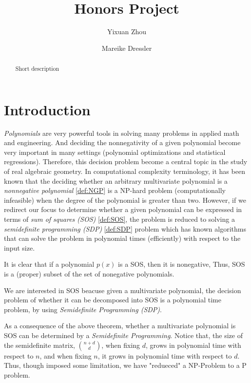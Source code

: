 \documentclass[12pt]{amsart}
\title{Honors Project}
\author{Yixuan Zhou} \author{Mareike Dressler} %
\numberwithin{equation}{section}
\theoremstyle{definition}
\numberwithin{thm}{section}
\begin{document}
 

\begin{abstract}
Short description
\end{abstract}

\maketitle


\section{Introduction} 

\emph{Polynomials} are very powerful tools in solving many problems in applied math and engineering. 
And deciding the nonnegativity of a given polynomial become very important in many settings (polynomial optimizations and statistical regressions). 
Therefore, this decision problem become a central topic in the study of real algebraic geometry. 
In computational complexity terminology, it has been known that the deciding whether an arbitrary multivariate polynomial is a \emph{nonnegative polynomial} \ref{def:NGP} is a NP-hard problem (computationally infeasible) when the 
degree of the polynomial is greater than two. 
However, if we redirect our focus to determine whether a given polynomial can be expressed in terms of \emph{sum of squares (SOS)} \ref{def:SOS},
the problem is reduced to solving a \emph{semidefinite programming (SDP)} \ref{def:SDP} problem which 
has known algorithms that can solve the problem in polynomial times (efficiently) with respect to the input size.





It is clear that if a polynomial $p(x)$ is a SOS, then it is nonegative,
Thus, SOS is a (proper) subset of the set of nonegative polynomials. 

We are interested in SOS beacuse given a multivariate polynomial, the decision
problem of whether it can be decomposed into SOS is a polynomial time problem, by using
\emph{Semidefinite Programming (SDP)}.



\cite{Blekherman:Parrilo:Thomas}

\cite{Laurent:Survey}

As a consequence of the above theorem, whether a multivariate polynomial is SOS can be determined 
by a \emph{Semidefinite Programming}. Notice that, the size of the semidefinite matrix,
${n+d \choose d}$, when fixing $d$, grows in polynomial time with respect to $n$, and when 
fixing $n$, it grows in polynomial time with respect to $d$. Thus, though imposed some 
limitation, we have "redueced" a NP-Problem to a P problem. 
\end{document}
